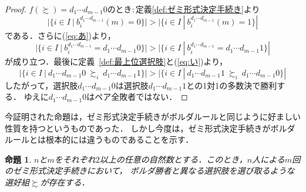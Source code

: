 \documentclass[dvipdfmx]{jsarticle}
\newtheorem{proposition}[definition]{命題}
\begin{document}
\begin{proof}
  \noindent$f(\succsim) = d_1\cdots d_{m-1}0$のとき$\colon$定義\ref{def:ゼミ形式決定手続き}より
  \[
    |\{ i \in I \ | \ b_{i}^{d_1\cdots d_{m-1}}(m)=0 \}| > |\{ i \in I \ | \ b_{i}^{d_1\cdots d_{m-1}}(m)=1 \}|
  \]
  である．さらに(\ref{eq:あ})より，
  \[
    |\{ i \in I \ | \ b_{i}^{d_1\cdots d_{m-1}}=d_1\cdots d_{m-1}0 \}| >
    |\{ i \in I \ | \ b_{i}^{d_1\cdots d_{m-1}}=d_1\cdots d_{m-1}1 \}|
  \]
  が成り立つ．最後に定義~\ref{def:最上位選択肢}と(\ref{eq:い})より，
  \[
    |\{ i \in I \ | \ d_1\cdots d_{m-1}0\ \succsim_i\ d_1\cdots d_{m-1}1 \}| >
    |\{ i \in I \ | \ d_1\cdots d_{m-1}1\ \succsim_i\ d_1\cdots d_{m-1}0 \}|
  \]
  したがって，選択肢$d_1\cdots d_{m-1}0$は選択肢$d_1\cdots d_{m-1}1$との1対1の多数決で勝利する．
  ゆえに$d_1\cdots d_{m-1}0$はペア全敗者ではない．
\end{proof}

今証明された命題は，ゼミ形式決定手続きがボルダルールと同じように好ましい性質を持つというものであった．
しかし今度は，ゼミ形式決定手続きがボルダルールとは根本的には違うものであることを示す．

\begin{proposition}\label{pro:ボルダルールとは違う}
  $n$と$m$をそれぞれ$2$以上の任意の自然数とする．このとき，$n$人による$m$回のゼミ形式決定手続きにおいて，
  ボルダ勝者と異なる選択肢を選び取るような選好組$\succsim$が存在する．
\end{proposition}
\end{document}
